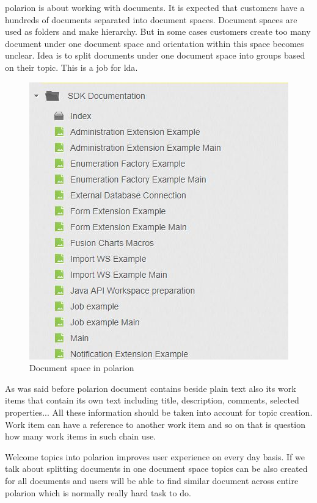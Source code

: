 \documentclass[thesis=M,english]{FITthesis}[2012/06/26]
\begin{document}
\acrshort{polarion} is about working with documents. It is expected that customers have a hundreds of documents separated into document spaces. Document spaces are used as folders and make hierarchy. But in some cases customers create too many document under one document space and orientation within this space becomes unclear. Idea is to split documents under one document space into groups based on their topic. This is a job for \acrshort{lda}.

\begin{figure}[h!]\centering
	\includegraphics[width=1\textwidth]{pictures/polarion_document_space}
	\caption{Document space in \acrshort{polarion}}\label{fig:polarion_document_space}
\end{figure}

As was said before \acrshort{polarion} document contains beside plain text also its work items that contain its own text including title, description, comments, selected properties... All these information should be taken into account for topic creation. Work item can have a reference to another work item and so on that is question how many work items in such chain use. 

Welcome topics into \acrshort{polarion} improves user experience on every day basis. If we talk about splitting documents in one document space topics can be also created for all documents and users will be able to find similar document across entire \acrshort{polarion} which is normally really hard task to do.
\end{document}
